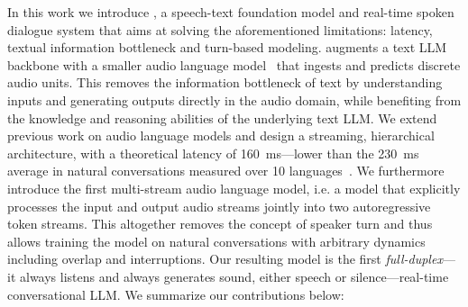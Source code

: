 In this work we introduce \ours{}, a speech-text foundation model and real-time spoken dialogue system that aims at solving the aforementioned limitations: latency, textual information bottleneck and turn-based modeling. \ours{} augments a text LLM backbone with a smaller audio language model~\citep{audiolm,uniaudio} that ingests and predicts discrete audio units. This removes the information bottleneck of text by understanding inputs and generating outputs directly in the audio domain, while benefiting from the knowledge and reasoning abilities of the underlying text LLM. We extend previous work on audio language models and design a streaming, hierarchical architecture, with a theoretical latency of \SI{160}{\ms}---lower than the \SI{230}{\ms} average in natural conversations measured over 10 languages~\citep{Stivers2009UniversalsAC}. We furthermore introduce the first multi-stream audio language model, i.e. a model that explicitly processes the input and output audio streams jointly into two autoregressive token streams. This altogether removes the concept of speaker turn and thus allows training the model on natural conversations with arbitrary dynamics including overlap and interruptions. Our resulting model is the first \textit{full-duplex}--- it always listens and always generates sound, either speech or silence---real-time conversational LLM. We summarize our contributions below:
